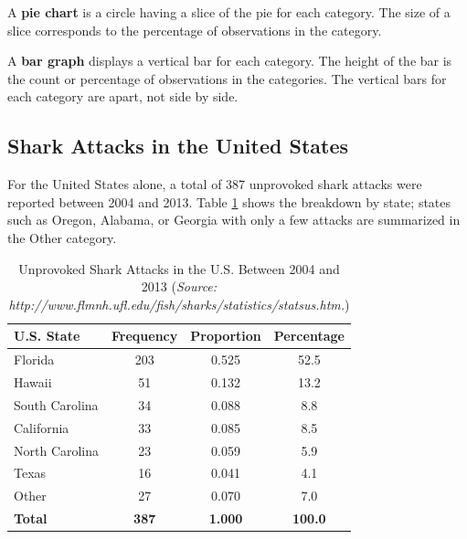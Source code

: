 A \textbf{pie chart} is a circle having a slice of the pie for each category. The size of a slice corresponds to the percentage of observations in the category.

A \textbf{bar graph} displays a vertical bar for each category. The height of the bar is the count or percentage of observations in the categories. The vertical bars for each category are apart, not side by side.

\subsection*{Shark Attacks in the United States}
For the United States alone, a total of 387 unprovoked shark attacks were reported between 2004 and 2013. Table \ref{tab:shark_attacks} shows the breakdown by state; states such as Oregon, Alabama, or Georgia with only a few attacks are summarized in the Other category.

\begin{table}[h!]
\centering
\begin{tabular}{|l|c|c|c|}
\hline
\textbf{U.S. State}      & \textbf{Frequency} & \textbf{Proportion} & \textbf{Percentage} \\ \hline
Florida                  & 203                & 0.525               & 52.5                \\ \hline
Hawaii                   & 51                 & 0.132               & 13.2                \\ \hline
South Carolina           & 34                 & 0.088               & 8.8                 \\ \hline
California               & 33                 & 0.085               & 8.5                 \\ \hline
North Carolina           & 23                 & 0.059               & 5.9                 \\ \hline
Texas                    & 16                 & 0.041               & 4.1                 \\ \hline
Other                    & 27                 & 0.070               & 7.0                 \\ \hline
\textbf{Total}           & \textbf{387}       & \textbf{1.000}      & \textbf{100.0}      \\ \hline
\end{tabular}
\caption{Unprovoked Shark Attacks in the U.S. Between 2004 and 2013 (\textit{Source: http://www.flmnh.ufl.edu/fish/sharks/statistics/statsus.htm.})}
\label{tab:shark_attacks}
\end{table}

